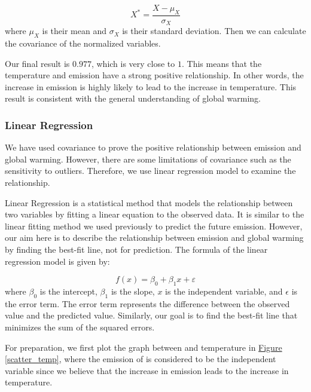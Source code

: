 \documentclass[12pt,a4paper]{article}
\begin{document}
    \begin{equation}
        X^*=\frac{X-\mu_X}{\sigma_X}
    \end{equation} where $\mu_X$ is their mean and $\sigma_X$ is their standard deviation. Then we can calculate the covariance of the normalized variables. 
    
    Our final result is $0.977$, which is very close to $1$. This means that the temperature and  emission have a strong positive relationship. In other words, the increase in  emission is highly likely to lead to the increase in temperature. This result is consistent with the general understanding of global warming.

    \subsubsection{Linear Regression}
    We have used covariance to prove the positive relationship between   emission and global warming. However, there are some limitations of covariance such as the sensitivity to outliers. Therefore, we use linear regression model to examine the relationship.

    Linear Regression is a statistical method that models the relationship between two variables by fitting a linear equation to the observed data. It is similar to the linear fitting method we used previously to predict the future  emission. However, our aim here is to describe the relationship between  emission and global warming by finding the best-fit line, not for prediction. The formula of the linear regression model is given by:

    \begin{equation}\label{9}
        f(x)=\beta_0+\beta_1x+\varepsilon
    \end{equation} where $\beta_0$ is the intercept, $\beta_1$ is the slope, $x$ is the independent variable, and $\epsilon$ is the error term. The error term represents the difference between the observed value and the predicted value. Similarly, our goal is to find the best-fit line that minimizes the sum of the squared errors.

    For preparation, we first plot the graph between  and temperature in \hyperref[scatter_temp]{Figure \ref*{scatter_temp}}, where the emission of  is considered to be the independent variable since we believe that the increase in  emission leads to the increase in temperature. 
\end{document}
